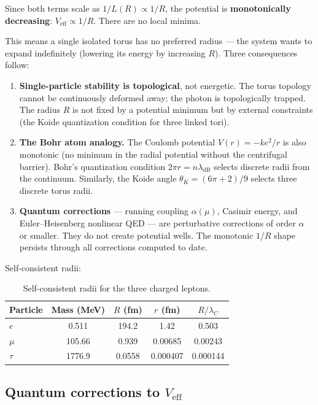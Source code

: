\documentclass[11pt,a4paper]{article}
\begin{document}
Since both terms scale as $1/L(R) \propto 1/R$, the potential is \textbf{monotonically decreasing}: $V_{\text{eff}} \propto 1/R$. There are no local minima.

This means a single isolated torus has no preferred radius --- the system wants to expand indefinitely (lowering its energy by increasing $R$). Three consequences follow:

\begin{enumerate}
  \item \textbf{Single-particle stability is topological}, not energetic. The torus topology cannot be continuously deformed away; the photon is topologically trapped. The radius $R$ is not fixed by a potential minimum but by external constraints (the Koide quantization condition for three linked tori).

  \item \textbf{The Bohr atom analogy.} The Coulomb potential $V(r) = -ke^2/r$ is also monotonic (no minimum in the radial potential without the centrifugal barrier). Bohr's quantization condition $2\pi r = n\lambda_{\text{dB}}$ selects discrete radii from the continuum. Similarly, the Koide angle $\theta_K = (6\pi + 2)/9$ selects three discrete torus radii.

  \item \textbf{Quantum corrections} --- running coupling $\alpha(\mu)$, Casimir energy, and Euler--Heisenberg nonlinear QED --- are perturbative corrections of order $\alpha$ or smaller. They do not create potential wells. The monotonic $1/R$ shape persists through all corrections computed to date.
\end{enumerate}

Self-consistent radii:

\begin{table}[h]
\centering
\begin{tabular}{@{}lcccc@{}}
\toprule
Particle & Mass (MeV) & $R$ (fm) & $r$ (fm) & $R/\lambda_C$ \\
\midrule
$e$ & 0.511 & 194.2 & 1.42 & 0.503 \\
$\mu$ & 105.66 & 0.939 & 0.00685 & 0.00243 \\
$\tau$ & 1776.9 & 0.0558 & 0.000407 & 0.000144 \\
\bottomrule
\end{tabular}
\caption{Self-consistent radii for the three charged leptons.}
\label{tab:lepton-radii}
\end{table}

\subsection{Quantum corrections to \texorpdfstring{$V_{\text{eff}}$}{V\_eff}}
\end{document}
